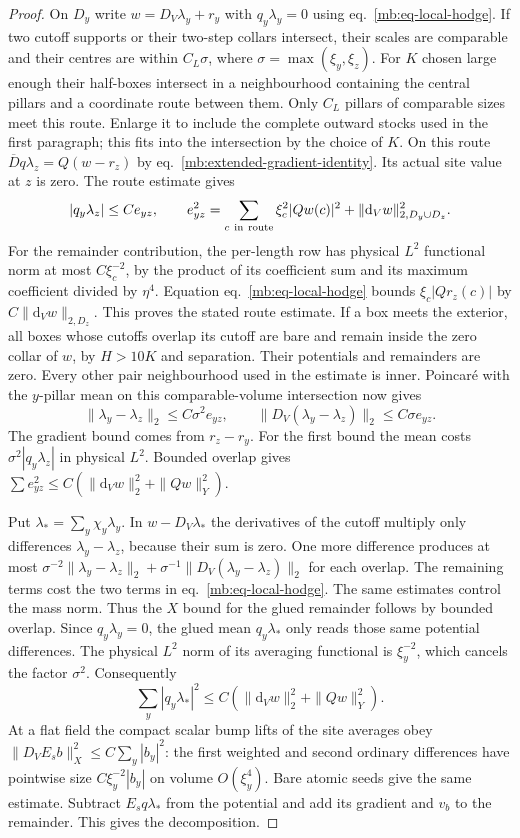 \documentclass[11pt,letterpaper,reqno]{amsart}
\numberwithin{equation}{section}
\renewcommand{\eqref}[1]{\textup{eq.~\ref{#1}}}
\theoremstyle{definition}
\theoremstyle{remark}
\begin{document}
\begin{proof}
On \(D_y\) write \(w=D_V\lambda_y+r_y\) with
\(q_y\lambda_y=0\) using \eqref{mb:eq-local-hodge}.
If two cutoff supports or their two-step collars intersect,
their scales are comparable and their centres are within
\(C_L\sigma\), where \(\sigma=\max(\xi_y,\xi_z)\).
For \(K\) chosen large enough their half-boxes intersect
in a neighbourhood containing the central pillars and a
coordinate route between them. Only \(C_L\) pillars of
comparable sizes meet this route. Enlarge it to include the
complete outward stocks used in the first paragraph;
this fits into the intersection by the choice of \(K\).
On this route \(\overline D q\lambda_z=Q(w-r_z)\) by
\eqref{mb:extended-gradient-identity}. Its actual site value
at \(z\) is zero. The route estimate gives
\[
  |q_y\lambda_z|\le C e_{yz},\qquad
  e_{yz}^2=\sum_{c\ {\rm in\ route}}\xi_c^2|Qw(c)|^2+
                                  \|\mathrm d_Vw\|_{2,D_y\cup D_z}^2 .
\]
For the remainder contribution, the per-length row has
physical \(L^2\) functional norm at most \(C\xi_c^{-2}\),
by the product of its coefficient sum and its maximum
coefficient divided by \(\eta^4\). Equation
\eqref{mb:eq-local-hodge} bounds \(\xi_c|Qr_z(c)|\)
by \(C\|\mathrm d_Vw\|_{2,D_z}\). This proves the stated
route estimate. If a box meets the exterior, all boxes whose
cutoffs overlap its cutoff are bare and remain inside the
zero collar of \(w\), by \(H>10K\) and separation. Their
potentials and remainders are zero. Every other pair
neighbourhood used in the estimate is inner.
Poincar\'e with the \(y\)-pillar mean on
this comparable-volume intersection now gives
\[
 \|\lambda_y-\lambda_z\|_2\le C\sigma^2 e_{yz},\qquad
 \|D_V(\lambda_y-\lambda_z)\|_2\le C\sigma e_{yz}.
\]
The gradient bound comes from \(r_z-r_y\). For the first
bound the mean costs \(\sigma^2|q_y\lambda_z|\) in physical
\(L^2\). Bounded overlap gives
\(\sum e_{yz}^2\le C(\|\mathrm d_Vw\|_2^2+\|Qw\|_Y^2)\).

Put \(\lambda_*=\sum_y\chi_y\lambda_y\).
In \(w-D_V\lambda_*\) the derivatives of the cutoff multiply
only differences \(\lambda_y-\lambda_z\), because their
sum is zero. One more difference produces at most
\(\sigma^{-2}\|\lambda_y-\lambda_z\|_2+
 \sigma^{-1}\|D_V(\lambda_y-\lambda_z)\|_2\)
for each overlap. The remaining terms cost the two terms
in \eqref{mb:eq-local-hodge}. The same estimates control
the mass norm. Thus the \(X\) bound for the glued remainder
follows by bounded overlap. Since \(q_y\lambda_y=0\), the
glued mean \(q_y\lambda_*\) only reads those same potential
differences. The physical \(L^2\) norm of its averaging
functional is \(\xi_y^{-2}\), which cancels the factor
\(\sigma^2\). Consequently
\[
          \sum_y|q_y\lambda_*|^2
                       \le C(\|\mathrm d_Vw\|_2^2+\|Qw\|_Y^2).
\]
At a flat field the compact scalar bump lifts of the site
averages obey
\(\|D_V E_s b\|_X^2\le C\sum_y|b_y|^2\):
the first weighted and second ordinary differences have
pointwise size \(C\xi_y^{-2}|b_y|\) on volume
\(O(\xi_y^4)\). Bare atomic seeds give the same estimate.
Subtract \(E_s q\lambda_*\) from the potential and add its
gradient and \(v_b\) to the remainder. This gives the
decomposition.


\end{proof}
\end{document}
